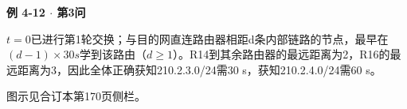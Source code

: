 {\color{ink}\bfseries 例 4-12 \(\cdot \) 第3问}\par\vspace{1bp}\(t=\allowbreak{}0\)已进行第1轮交换；与目的网直连路由器相距d条内部链路的节点，最早在\((d-1)\times 30 s\)学到该路由（\(d\ge 1\)）。R14到其余路由器的最远距离为2，R16的最远距离为3，因此全体正确获知210.2.3.0/\allowbreak{}24需30 s，获知210.2.4.0/\allowbreak{}24需60 s。\par {\color{ink}图示见合订本第170页侧栏。}
